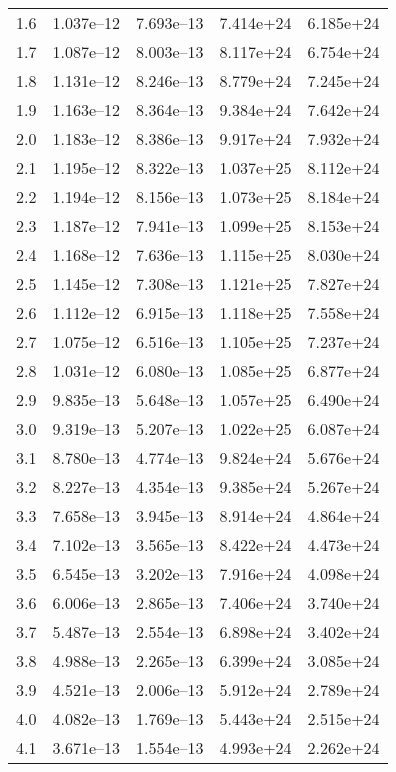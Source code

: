 \documentclass[a4paper,fleqn,usenatbib]{mnras}
\begin{document}
\begin{table*}
\begin{tabular}{ccccc}
    1.6 & 1.037e--12 & 7.693e--13 & 7.414e+24 & 6.185e+24 \\
    1.7 & 1.087e--12 & 8.003e--13 & 8.117e+24 & 6.754e+24 \\
    1.8 & 1.131e--12 & 8.246e--13 & 8.779e+24 & 7.245e+24 \\
    1.9 & 1.163e--12 & 8.364e--13 & 9.384e+24 & 7.642e+24 \\
    2.0 & 1.183e--12 & 8.386e--13 & 9.917e+24 & 7.932e+24 \\
    2.1 & 1.195e--12 & 8.322e--13 & 1.037e+25 & 8.112e+24 \\
    2.2 & 1.194e--12 & 8.156e--13 & 1.073e+25 & 8.184e+24 \\
    2.3 & 1.187e--12 & 7.941e--13 & 1.099e+25 & 8.153e+24 \\
    2.4 & 1.168e--12 & 7.636e--13 & 1.115e+25 & 8.030e+24 \\
    2.5 & 1.145e--12 & 7.308e--13 & 1.121e+25 & 7.827e+24 \\
    2.6 & 1.112e--12 & 6.915e--13 & 1.118e+25 & 7.558e+24 \\
    2.7 & 1.075e--12 & 6.516e--13 & 1.105e+25 & 7.237e+24 \\
    2.8 & 1.031e--12 & 6.080e--13 & 1.085e+25 & 6.877e+24 \\
    2.9 & 9.835e--13 & 5.648e--13 & 1.057e+25 & 6.490e+24 \\
    3.0 & 9.319e--13 & 5.207e--13 & 1.022e+25 & 6.087e+24 \\
    3.1 & 8.780e--13 & 4.774e--13 & 9.824e+24 & 5.676e+24 \\
    3.2 & 8.227e--13 & 4.354e--13 & 9.385e+24 & 5.267e+24 \\
    3.3 & 7.658e--13 & 3.945e--13 & 8.914e+24 & 4.864e+24 \\
    3.4 & 7.102e--13 & 3.565e--13 & 8.422e+24 & 4.473e+24 \\
    3.5 & 6.545e--13 & 3.202e--13 & 7.916e+24 & 4.098e+24 \\
    3.6 & 6.006e--13 & 2.865e--13 & 7.406e+24 & 3.740e+24 \\
    3.7 & 5.487e--13 & 2.554e--13 & 6.898e+24 & 3.402e+24 \\
    3.8 & 4.988e--13 & 2.265e--13 & 6.399e+24 & 3.085e+24 \\
    3.9 & 4.521e--13 & 2.006e--13 & 5.912e+24 & 2.789e+24 \\
    4.0 & 4.082e--13 & 1.769e--13 & 5.443e+24 & 2.515e+24 \\
    4.1 & 3.671e--13 & 1.554e--13 & 4.993e+24 & 2.262e+24 \\

\end{tabular}
\end{table*}
\end{document}
